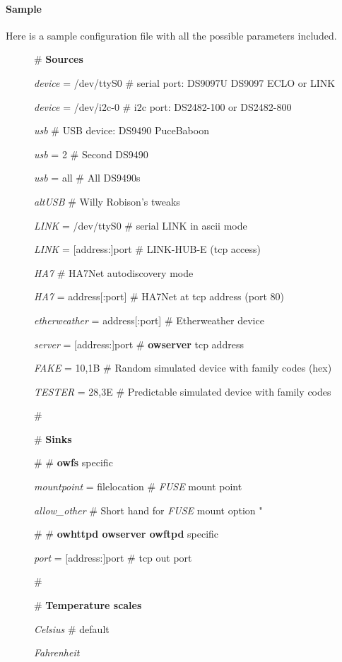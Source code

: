 \paragraph*{Sample}
\begin{description}
\item [Here is a sample
configuration file with all the possible parameters included. ] \# \textbf{Sources}


\textit{device} = /dev/ttyS0 \# serial port: DS9097U DS9097 ECLO or LINK 

\textit{device} = /dev/i2c-0 \# i2c port: DS2482-100 or DS2482-800 

\textit{usb} \#       USB device: DS9490 PuceBaboon 

\textit{usb} = 2 \#   Second DS9490 

\textit{usb} = all \# All DS9490s 

\textit{altUSB} \# Willy Robison's tweaks 

\textit{LINK} = /dev/ttyS0 \#     serial LINK in ascii mode 

\textit{LINK} = [address:]port \# LINK-HUB-E (tcp access) 

\textit{HA7} \# HA7Net autodiscovery mode 

\textit{HA7} = address[:port] \# HA7Net at tcp address (port 80) 

\textit{etherweather} = address[:port] \# Etherweather device 

\textit{server} = [address:]port \# \textbf{owserver} tcp address 

\textit{FAKE} = 10,1B \# Random simulated device with family codes (hex) 

\textit{TESTER} = 28,3E \# Predictable simulated device with family codes 

\# 

\# \textbf{Sinks} 

\# \# \textbf{owfs} specific 

\textit{mountpoint} = filelocation \# \textit{FUSE} mount point 

\textit{allow\_other} \# Short hand for \textit{FUSE} mount option " 

\# \# \textbf{owhttpd owserver owftpd} specific 

\textit{port} = [address:]port \# tcp out port 

\# 

\# \textbf{Temperature scales} 

\textit{Celsius} \# default 

\textit{Fahrenheit} 


\end{description}

